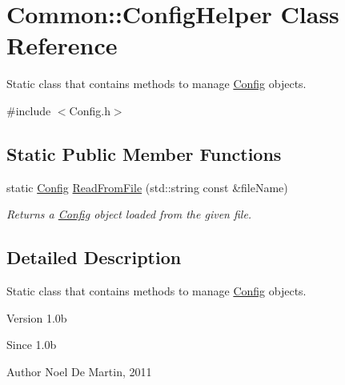 \hypertarget{class_common_1_1_config_helper}{\section{Common\-:\-:Config\-Helper Class Reference}
\label{class_common_1_1_config_helper}
}


Static class that contains methods to manage \hyperlink{class_common_1_1_config}{Config} objects.  




{\ttfamily \#include $<$Config.\-h$>$}

\subsection*{Static Public Member Functions}
\begin{DoxyCompactItemize}
\item 
static \hyperlink{class_common_1_1_config}{Config} \hyperlink{class_common_1_1_config_helper_afa10958df84884f23c6141857805602d}{Read\-From\-File} (std\-::string const \&file\-Name)
\begin{DoxyCompactList}\small\item\em Returns a \hyperlink{class_common_1_1_config}{Config} object loaded from the given file. \end{DoxyCompactList}\end{DoxyCompactItemize}


\subsection{Detailed Description}
Static class that contains methods to manage \hyperlink{class_common_1_1_config}{Config} objects. 

\begin{DoxyVersion}{Version}
1.\-0b 
\end{DoxyVersion}
\begin{DoxySince}{Since}
1.\-0b 
\end{DoxySince}
\begin{DoxyAuthor}{Author}
Noel De Martin, 2011 
\end{DoxyAuthor}


